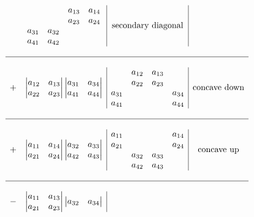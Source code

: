 \documentclass{overview}
\begin{document}
\[\begin{array}{c}
\begin{array}{cc|c|c}
		 &
\begin{matrix}
         &         & a_{13} & a_{14} \\
         &         & a_{23} & a_{24} \\
	a_{31} & a_{32} \\
	a_{41} & a_{42} \\
\end{matrix}
& \text{secondary diagonal}
\\ \\ \hline \\
		+&
		\begin{vmatrix}
			a_{12} & a_{13} \\
			a_{22} & a_{23} \\
		\end{vmatrix}
		\begin{vmatrix}
			a_{31} & a_{34} \\
			a_{41} & a_{44} \\
		\end{vmatrix}
		 &
\begin{matrix}
         & a_{12} & a_{13} \\
         & a_{22} & a_{23} \\
	a_{31} &        &         & a_{34} \\
	a_{41} &        &         & a_{44} \\
\end{matrix}
& \text{concave down}
\\ \\ \hline \\
		+&
		\begin{vmatrix}
			a_{11} & a_{14} \\
			a_{21} & a_{24} \\
		\end{vmatrix}
		\begin{vmatrix}
			a_{32} & a_{33} \\
			a_{42} & a_{43} \\
		\end{vmatrix}
		 &
\begin{matrix}
	a_{11} &        &         & a_{14} \\
	a_{21} &        &         & a_{24} \\
         & a_{32} & a_{33} \\
         & a_{42} & a_{43} \\
\end{matrix}
		 & \text{concave up}
\\ \\ \hline \\
		-&
		\begin{vmatrix}
			a_{11} & a_{13} \\
			a_{21} & a_{23} \\
		\end{vmatrix}
		\begin{vmatrix}
			a_{32} & a_{34} \\

\end{vmatrix}
\end{array}
\end{array}\]
\end{document}
